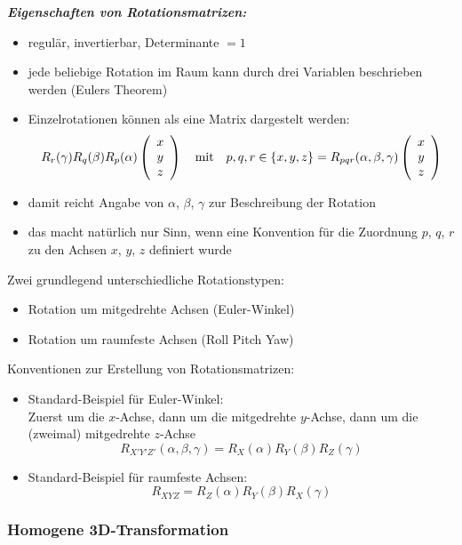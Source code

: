 \textbf{\textsl{Eigenschaften von Rotationsmatrizen:}}
\begin{itemize}
\item regulär, invertierbar, Determinante $=1$
\item jede beliebige Rotation im Raum kann durch drei Variablen beschrieben werden (Eulers Theorem)
\item Einzelrotationen können als eine Matrix dargestelt werden: $$R_r(\gamma) R_q(\beta) R_p(\alpha) \left( \begin{array}{c} x \\ y \\ z \end{array} \right) \quad \textrm{mit} \quad p,q,r \in \{x,y,z\} = R_{pqr}(\alpha, \beta, \gamma) \left( \begin{array}{c} x \\ y \\ z \end{array} \right)$$
\item damit reicht Angabe von $\alpha$, $\beta$, $\gamma$ zur Beschreibung der Rotation
\item das macht natürlich nur Sinn, wenn eine Konvention für die Zuordnung $p$, $q$, $r$ zu den Achsen $x$, $y$, $z$ definiert wurde
\end{itemize}
Zwei grundlegend unterschiedliche Rotationstypen:
\begin{itemize}
\item Rotation um mitgedrehte Achsen (Euler-Winkel)
\item Rotation um raumfeste Achsen (Roll Pitch Yaw)
\end{itemize}
Konventionen zur Erstellung von Rotationsmatrizen:
\begin{itemize}
\item Standard-Beispiel für Euler-Winkel: \\ Zuerst um die $x$-Achse, dann um die mitgedrehte $y$-Achse, dann um die (zweimal) mitgedrehte $z$-Achse $$R_{X'Y'Z'}(\alpha , \beta , \gamma) = R_X(\alpha) R_Y(\beta) R_Z(\gamma)$$
\item Standard-Beispiel für raumfeste Achsen: $$R_{XYZ} = R_Z(\alpha) R_Y(\beta) R_X(\gamma)$$
\end{itemize}

\subsubsection*{Homogene 3D-Transformation}

